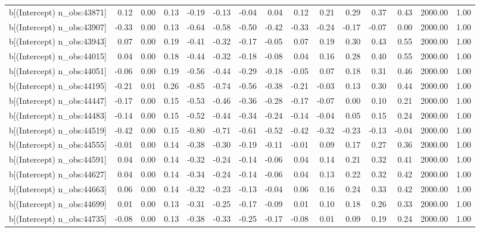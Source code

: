 \begin{table}[ht]
\begin{tabular}{rrrrrrrrrrrrrrr}
  b[(Intercept) n\_obs:43871] & 0.12 & 0.00 & 0.13 & -0.19 & -0.13 & -0.04 & 0.04 & 0.12 & 0.21 & 0.29 & 0.37 & 0.43 & 2000.00 & 1.00 \\ 
  b[(Intercept) n\_obs:43907] & -0.33 & 0.00 & 0.13 & -0.64 & -0.58 & -0.50 & -0.42 & -0.33 & -0.24 & -0.17 & -0.07 & 0.00 & 2000.00 & 1.00 \\ 
  b[(Intercept) n\_obs:43943] & 0.07 & 0.00 & 0.19 & -0.41 & -0.32 & -0.17 & -0.05 & 0.07 & 0.19 & 0.30 & 0.43 & 0.55 & 2000.00 & 1.00 \\ 
  b[(Intercept) n\_obs:44015] & 0.04 & 0.00 & 0.18 & -0.44 & -0.32 & -0.18 & -0.08 & 0.04 & 0.16 & 0.28 & 0.40 & 0.55 & 2000.00 & 1.00 \\ 
  b[(Intercept) n\_obs:44051] & -0.06 & 0.00 & 0.19 & -0.56 & -0.44 & -0.29 & -0.18 & -0.05 & 0.07 & 0.18 & 0.31 & 0.46 & 2000.00 & 1.00 \\ 
  b[(Intercept) n\_obs:44195] & -0.21 & 0.01 & 0.26 & -0.85 & -0.74 & -0.56 & -0.38 & -0.21 & -0.03 & 0.13 & 0.30 & 0.44 & 2000.00 & 1.00 \\ 
  b[(Intercept) n\_obs:44447] & -0.17 & 0.00 & 0.15 & -0.53 & -0.46 & -0.36 & -0.28 & -0.17 & -0.07 & 0.00 & 0.10 & 0.21 & 2000.00 & 1.00 \\ 
  b[(Intercept) n\_obs:44483] & -0.14 & 0.00 & 0.15 & -0.52 & -0.44 & -0.34 & -0.24 & -0.14 & -0.04 & 0.05 & 0.15 & 0.24 & 2000.00 & 1.00 \\ 
  b[(Intercept) n\_obs:44519] & -0.42 & 0.00 & 0.15 & -0.80 & -0.71 & -0.61 & -0.52 & -0.42 & -0.32 & -0.23 & -0.13 & -0.04 & 2000.00 & 1.00 \\ 
  b[(Intercept) n\_obs:44555] & -0.01 & 0.00 & 0.14 & -0.38 & -0.30 & -0.19 & -0.11 & -0.01 & 0.09 & 0.17 & 0.27 & 0.36 & 2000.00 & 1.00 \\ 
  b[(Intercept) n\_obs:44591] & 0.04 & 0.00 & 0.14 & -0.32 & -0.24 & -0.14 & -0.06 & 0.04 & 0.14 & 0.21 & 0.32 & 0.41 & 2000.00 & 1.00 \\ 
  b[(Intercept) n\_obs:44627] & 0.04 & 0.00 & 0.14 & -0.34 & -0.24 & -0.14 & -0.06 & 0.04 & 0.13 & 0.22 & 0.32 & 0.42 & 2000.00 & 1.00 \\ 
  b[(Intercept) n\_obs:44663] & 0.06 & 0.00 & 0.14 & -0.32 & -0.23 & -0.13 & -0.04 & 0.06 & 0.16 & 0.24 & 0.33 & 0.42 & 2000.00 & 1.00 \\ 
  b[(Intercept) n\_obs:44699] & 0.01 & 0.00 & 0.13 & -0.31 & -0.25 & -0.17 & -0.09 & 0.01 & 0.10 & 0.18 & 0.26 & 0.33 & 2000.00 & 1.00 \\ 
  b[(Intercept) n\_obs:44735] & -0.08 & 0.00 & 0.13 & -0.38 & -0.33 & -0.25 & -0.17 & -0.08 & 0.01 & 0.09 & 0.19 & 0.24 & 2000.00 & 1.00 \\ 

\end{tabular}
\end{table}
